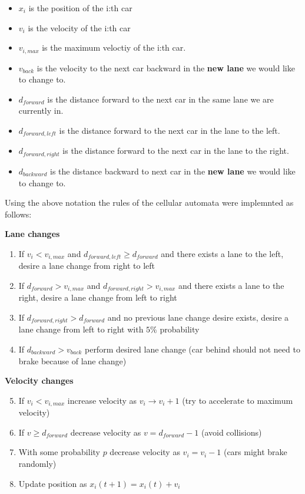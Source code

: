 \documentclass[a4paper,12pt]{article}
\begin{document}
\begin{itemize}
    \item $x_i$ is the position of the i:th car
    \item $v_i$ is the velocity of the i:th car
    \item $v_{i, max}$ is the maximum veloctiy of the i:th car.
    \item $v_{back}$ is the velocity to the next car backward in the \textbf{new lane} we would like to change to.
    \item $d_{forward}$ is the distance forward to the next car in the same lane we are currently in.
    \item $d_{forward, left}$ is the distance forward to the next car in the lane to the left.
    \item $d_{forward, right}$ is the distance forward to the next car in the lane to the right.
    \item $d_{backward}$ is the distance backward to next car in the \textbf{new lane} we would like to change to.
\end{itemize}

Using the above notation the rules of the cellular automata were implemnted as follows:

\textbf{Lane changes}
\begin{enumerate}
    \item If $v_i<v_{i,max}$ and $d_{forward, left}\geq d_{forward}$ and there exists a lane to the left, desire a lane change from right to left
    \item If $d_{forward} > v_{i, max}$ and $d_{forward, right} > v_{i, max}$ and there exists a lane to the right, desire a lane change from left to right
    \item If $d_{forward, right} > d_{forward}$ and no previous lane change desire exists, desire a lane change from left to right with $5\%$ probability
    \item If $d_{backward} > v_{back}$ perform desired lane change (car behind should not need to brake because of lane change)
\end{enumerate}

\textbf{Velocity changes}
\begin{enumerate}
    \setcounter{enumi}{4}
    \item If $v_i<v_{i, max}$ increase velocity as $v_i \rightarrow v_i+1$ (try to accelerate to maximum velocity)
    \item If $v \geq d_{forward}$ decrease velocity as $v = d_{forward} - 1$ (avoid collisions)
    \item With some probability $p$ decrease velocity as $v_i=v_i-1$ (cars might brake randomly)
    \item Update position as $x_i(t+1) = x_i(t) + v_i$
\end{enumerate}
\end{document}
